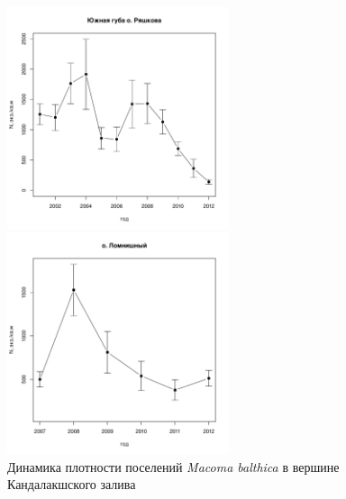 \documentclass[12pt, a4paper]{article}
\begin{document}
\begin{figure}[h]
\begin{minipage}[b]{.46\linewidth}
\begin{center}
\includegraphics[width=65mm]{../White_Sea/Ryashkov_YuG/N_dynamic.pdf}
\end{center}
\end{minipage}
%
\hfil %
%
\begin{minipage}[b]{.46\linewidth}
\begin{center}
\includegraphics[width=65mm]{../White_Sea/Lomnishniy/N_dynamic.pdf}
\end{center}
\end{minipage}



\caption{Динамика плотности поселений {\it Macoma balthica} в вершине Кандалакшского залива}
\label{ris:dynamic_Kandalaksha_all}
\end{figure}
\end{document}
